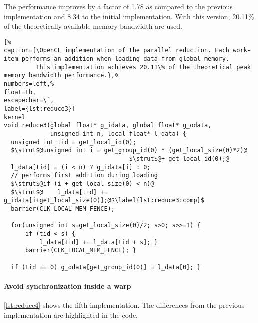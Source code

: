 The performance improves by a factor of 1.78 as compared to the previous implementation and 8.34 to the initial implementation.
With this version, 20.11\% of the theoretically available memory bandwidth are used.


\begin{lstlisting}[%                                                             
caption={\OpenCL implementation of the parallel reduction. Each work-item performs an addition when loading data from global memory.
         This implementation achieves 20.11\% of the theoretical peak memory bandwidth performance.},%
numbers=left,%
float=tb,
escapechar=\`,
label={lst:reduce3}]
kernel
void reduce3(global float* g_idata, global float* g_odata,
             unsigned int n, local float* l_data) {
  unsigned int tid = get_local_id(0);
  $\strut$@unsigned int i = get_group_id(0) * (get_local_size(0)*2)@
                                   $\strut$@+ get_local_id(0);@
  l_data[tid] = (i < n) ? g_idata[i] : 0;
  // performs first addition during loading
  $\strut$@if (i + get_local_size(0) < n)@
  $\strut$@    l_data[tid] += g_idata[i+get_local_size(0)];@$\label{lst:reduce3:comp}$
  barrier(CLK_LOCAL_MEM_FENCE);

  for(unsigned int s=get_local_size(0)/2; s>0; s>>=1) {
      if (tid < s) {
          l_data[tid] += l_data[tid + s]; }
      barrier(CLK_LOCAL_MEM_FENCE); }

  if (tid == 0) g_odata[get_group_id(0)] = l_data[0]; }
\end{lstlisting}

\newpage

\paragraph{Avoid synchronization inside a warp}

\autoref{lst:reduce4} shows the fifth implementation.
The differences from the previous implementation are highlighted in the code.

